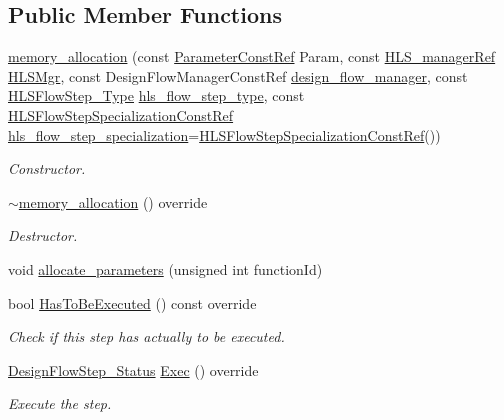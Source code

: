 \subsection*{Public Member Functions}
\begin{DoxyCompactItemize}
\item 
\hyperlink{classmemory__allocation_a33e5867e0afa36110b75e50885414a6b}{memory\+\_\+allocation} (const \hyperlink{Parameter_8hpp_a37841774a6fcb479b597fdf8955eb4ea}{Parameter\+Const\+Ref} Param, const \hyperlink{hls__manager_8hpp_acd3842b8589fe52c08fc0b2fcc813bfe}{H\+L\+S\+\_\+manager\+Ref} \hyperlink{classHLS__step_ade85003a99d34134418451ddc46a18e9}{H\+L\+S\+Mgr}, const Design\+Flow\+Manager\+Const\+Ref \hyperlink{classDesignFlowStep_ab770677ddf087613add30024e16a5554}{design\+\_\+flow\+\_\+manager}, const \hyperlink{hls__step_8hpp_ada16bc22905016180e26fc7e39537f8d}{H\+L\+S\+Flow\+Step\+\_\+\+Type} \hyperlink{classHLS__step_aefd59af15346ec3f10bf12bd756e6777}{hls\+\_\+flow\+\_\+step\+\_\+type}, const \hyperlink{hls__step_8hpp_a5fdd2edf290c196531d21d68e13f0e74}{H\+L\+S\+Flow\+Step\+Specialization\+Const\+Ref} \hyperlink{classHLS__step_a843be75ba53b81876aa3c8b870ae8a55}{hls\+\_\+flow\+\_\+step\+\_\+specialization}=\hyperlink{hls__step_8hpp_a5fdd2edf290c196531d21d68e13f0e74}{H\+L\+S\+Flow\+Step\+Specialization\+Const\+Ref}())
\begin{DoxyCompactList}\small\item\em Constructor. \end{DoxyCompactList}\item 
\hyperlink{classmemory__allocation_a4454e6e5d1907c813cae74fbfc5287c2}{$\sim$memory\+\_\+allocation} () override
\begin{DoxyCompactList}\small\item\em Destructor. \end{DoxyCompactList}\item 
void \hyperlink{classmemory__allocation_aa7ac453565415a72d89c814c8206bbba}{allocate\+\_\+parameters} (unsigned int function\+Id)
\item 
bool \hyperlink{classmemory__allocation_a933144a32a794f82719db7874abd3562}{Has\+To\+Be\+Executed} () const override
\begin{DoxyCompactList}\small\item\em Check if this step has actually to be executed. \end{DoxyCompactList}\item 
\hyperlink{design__flow__step_8hpp_afb1f0d73069c26076b8d31dbc8ebecdf}{Design\+Flow\+Step\+\_\+\+Status} \hyperlink{classmemory__allocation_a2e53598d28bd9c5f3bc153b15a88759b}{Exec} () override
\begin{DoxyCompactList}\small\item\em Execute the step. \end{DoxyCompactList}\end{DoxyCompactItemize}
